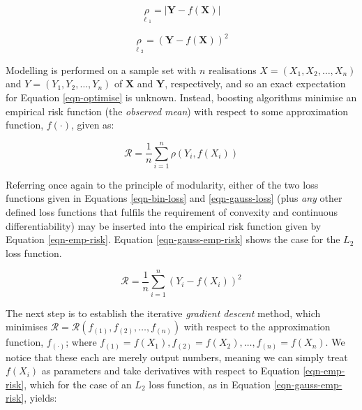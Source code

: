 \documentclass{article}
\begin{document}
  \begin{equation}
    \underset{\ell{_1}}{\rho} = |\mathbf{Y} - f(\mathbf{X})|
    \label{eqn-bin-loss}
  \end{equation}

  \begin{equation}
     \underset{\ell{_2}}{\rho} = (\mathbf{Y} - f(\mathbf{X}))^2
    \label{eqn-gauss-loss}
  \end{equation}

\vspace{3mm}

Modelling is performed on a sample set with $n$ realisations $X = (X_1, X_2, … , X_n)$ and $Y = (Y_1, Y_2, … , Y_n)$ of $\mathbf{X}$ and $\mathbf{Y}$, respectively, and so an exact expectation for Equation \eqref{eqn-optimise} is unknown. Instead, boosting algorithms minimise an empirical risk function (the \emph{observed mean}) with respect to some approximation function, $f(\cdot)$, given as:

\begin{equation}
  \label{eqn-emp-risk}
  \mathcal{R} = \frac{1}{n} \sum_{i=1}^{n} \rho(Y_i, f(X_i))
\end{equation}

\vspace{3mm}

Referring once again to the principle of modularity, either of the two loss functions given in Equations \eqref{eqn-bin-loss} and \eqref{eqn-gauss-loss} (plus \emph{any} other defined loss functions that fulfils the requirement of convexity and continuous differentiability) may be inserted into the empirical risk function given by Equation \eqref{eqn-emp-risk}. Equation \eqref{eqn-gauss-emp-risk} shows the case for the $L_2$ loss function.

\begin{equation}
  \mathcal{R} = \frac{1}{n} \sum_{i=1}^{n} (Y_i - f(X_i))^2
  \label{eqn-gauss-emp-risk}
\end{equation}

\vspace{3mm}

The next step is to establish the iterative \emph{gradient descent} method, which minimises $\mathcal{R} = \mathcal{R}(f_{(1)}, f_{(2)}, … , f_{(n)})$ with respect to the approximation function, $f_{(\cdot)}$; where $f_{(1)} = f(X_1), f_{(2)} = f(X_2), … , f_{(n)} = f(X_n)$. We notice that these each are merely output numbers, meaning we can simply treat $f(X_i)$ as parameters and take derivatives with respect to Equation \eqref{eqn-emp-risk}, which for the case of an $L_2$ loss function, as in Equation \eqref{eqn-gauss-emp-risk}, yields:
\end{document}
